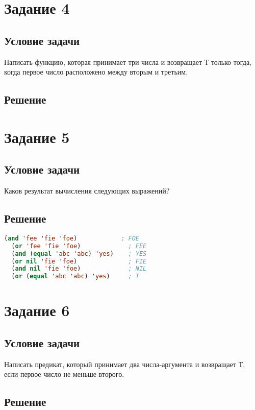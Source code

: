 \section*{Задание 4}
\subsection*{Условие задачи}
Написать функцию, которая принимает три числа и возвращает Т только тогда, когда первое число расположено между вторым и третьим.

\subsection*{Решение}



\section*{Задание 5}
\subsection*{Условие задачи}
Каков результат вычисления следующих выражений?

\subsection*{Решение}

\begin{lstlisting}[label=5xd,caption=Решение задания №5, language=lisp]
  (and 'fee 'fie 'foe)            ; FOE
  (or 'fee 'fie 'foe)             ; FEE
  (and (equal 'abc 'abc) 'yes)    ; YES
  (or nil 'fie 'foe)              ; FIE
  (and nil 'fie 'foe)             ; NIL
  (or (equal 'abc 'abc) 'yes)     ; T
\end{lstlisting}

\section*{Задание 6}
\subsection*{Условие задачи}
Написать предикат, который принимает два числа-аргумента и возвращает Т, если первое число не меньше второго.

\subsection*{Решение}


